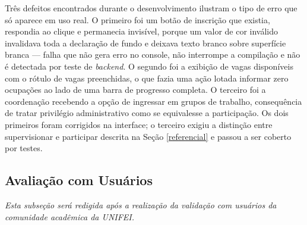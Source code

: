 Três defeitos encontrados durante o desenvolvimento ilustram o tipo de erro que só aparece em uso real. O primeiro foi um botão de inscrição que existia, respondia ao clique e permanecia invisível, porque um valor de cor inválido invalidava toda a declaração de fundo e deixava texto branco sobre superfície branca — falha que não gera erro no console, não interrompe a compilação e não é detectada por teste de \textit{backend}. O segundo foi a exibição de vagas disponíveis com o rótulo de vagas preenchidas, o que fazia uma ação lotada informar zero ocupações ao lado de uma barra de progresso completa. O terceiro foi a coordenação recebendo a opção de ingressar em grupos de trabalho, consequência de tratar privilégio administrativo como se equivalesse a participação. Os dois primeiros foram corrigidos na interface; o terceiro exigiu a distinção entre supervisionar e participar descrita na Seção \ref{referencial} e passou a ser coberto por testes.

\subsection{Avaliação com Usuários}
\label{avaliacao-usuarios}

%
%
%

\textit{Esta subseção será redigida após a realização da validação com usuários da comunidade acadêmica da UNIFEI.}
